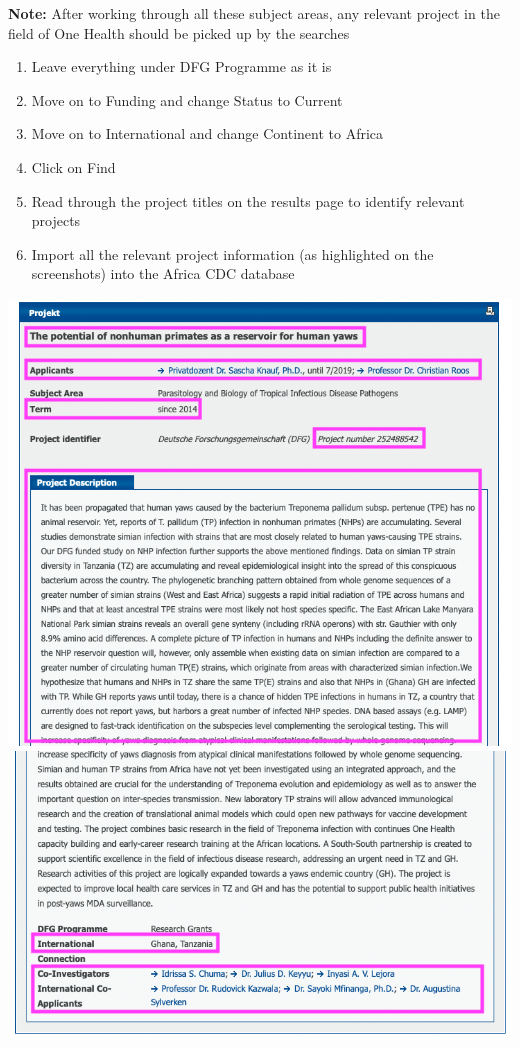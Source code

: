 \documentclass[
]{book}
\begin{document}
\textbf{Note:} After working through all these subject areas, any relevant project in the field of One Health should be picked up by the searches

\begin{enumerate}
\def\labelenumi{\arabic{enumi}.}
\setcounter{enumi}{3}
\item
  Leave everything under DFG Programme as it is
\item
  Move on to Funding and change Status to Current
\item
  Move on to International and change Continent to Africa
\item
  Click on Find
\item
  Read through the project titles on the results page to identify relevant projects
\item
  Import all the relevant project information (as highlighted on the screenshots) into the Africa CDC database
\end{enumerate}

\includegraphics{images/gepris1.png}
\includegraphics{images/gepris2.png}
\end{document}
